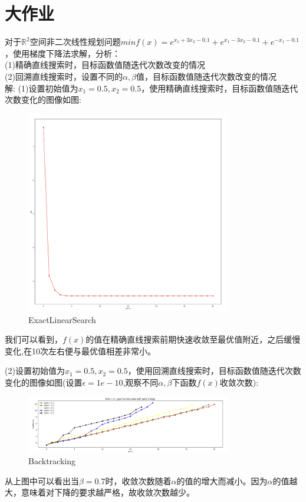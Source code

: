 \documentclass{article}
\begin{document}
\newpage
{\centering\section*{大作业}}
对于$\mathbb{R}^2$空间非二次线性规划问题$min f(x) = e^{x_1 + 3x_2 -0.1} + e^{x_1 - 3x_2- 0.1 } + e^{-x_1-0.1}$，使用梯度下降法求解，分析：\\
(1)精确直线搜索时，目标函数值随迭代次数改变的情况\\
(2)回溯直线搜索时，设置不同的$\alpha,\beta$值，目标函数值随迭代次数改变的情况\\
解:
(1)设置初始值为$x_1 = 0.5, x_2 = 0.5$，使用精确直线搜索时，目标函数值随迭代次数变化的图像如图:\\
\begin{figure}[H] 
    \centering 
    \includegraphics[width=0.8\textwidth]{ELS.png}
    \caption*{ExactLinearSearch}
\end{figure}
我们可以看到，$f(x)$的值在精确直线搜索前期快速收敛至最优值附近，之后缓慢变化,在10次左右便与最优值相差非常小。

(2)设置初始值为$x_1 = 0.5, x_2 = 0.5$，使用回溯直线搜索时，目标函数值随迭代次数变化的图像如图(设置$\epsilon = 1e-10$,观察不同$\alpha,\beta$下函数$f(x)$收敛次数):\\
\begin{figure}[H] 
    \centering 
    \includegraphics[width=0.8\textwidth]{Backtracking1.png}
    \caption*{Backtracking}
\end{figure}
从上图中可以看出当$\beta = 0.7$时，收敛次数随着$\alpha$的值的增大而减小。因为$\alpha$的值越大，意味着对下降的要求越严格，故收敛次数越少。
\end{document}
